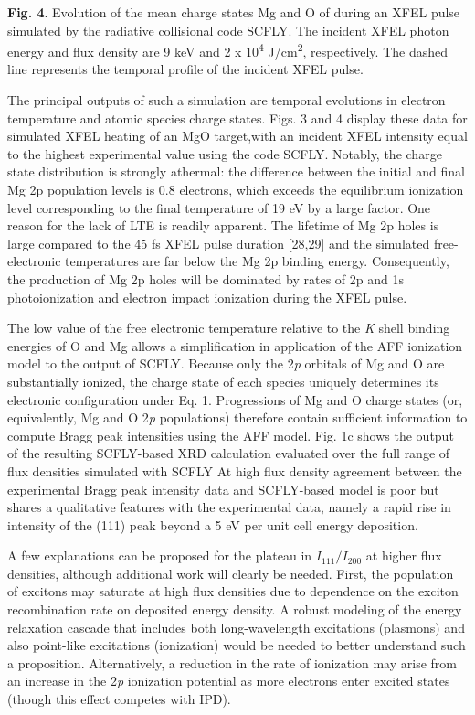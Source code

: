 \textbf{Fig. 4}. Evolution of the mean charge states Mg and O of during
an XFEL pulse simulated by the radiative collisional code SCFLY. The
incident XFEL photon energy and flux density are 9 keV and 2 x
10\textsuperscript{4} J/cm\textsuperscript{2}, respectively. The dashed
line represents the temporal profile of the incident XFEL pulse.

The principal outputs of such a simulation are temporal evolutions in
electron temperature and atomic species charge states. Figs. 3 and 4
display these data for simulated XFEL heating of an MgO target,with an
incident XFEL intensity equal to the highest experimental value using
the code SCFLY. Notably, the charge state distribution is strongly
athermal: the difference between the initial and final Mg 2p population
levels is 0.8 electrons, which exceeds the equilibrium ionization level
corresponding to the final temperature of 19 eV by a large factor. One
reason for the lack of LTE is readily apparent. The lifetime of Mg 2p
holes is large compared to the 45 fs XFEL pulse duration {[}28,29{]} and
the simulated free-electronic temperatures are far below the Mg 2p
binding energy. Consequently, the production of Mg 2p holes will be
dominated by rates of 2p and 1s photoionization and electron impact
ionization during the XFEL pulse.

\FloatBarrier

The low value of the free electronic temperature relative to the
\emph{K} shell binding energies of O and Mg allows a simplification in
application of the AFF ionization model to the output of SCFLY. Because
only the 2\emph{p} orbitals of Mg and O are substantially ionized, the
charge state of each species uniquely determines its electronic
configuration under Eq. 1. Progressions of Mg and O charge states (or,
equivalently, Mg and O 2\emph{p} populations) therefore contain
sufficient information to compute Bragg peak intensities using the AFF
model. Fig. 1c shows the output of the resulting SCFLY-based XRD
calculation evaluated over the full range of flux densities simulated
with SCFLY At high flux density agreement between the experimental Bragg
peak intensity data and SCFLY-based model is poor but shares a
qualitative features with the experimental data, namely a rapid rise in
intensity of the (111) peak beyond a 5 eV per unit cell energy
deposition.

A few explanations can be proposed for the plateau in
\(I_{111}/I_{200}\) at higher flux densities, although additional work
will clearly be needed. First, the population of excitons may saturate
at high flux densities due to dependence on the exciton recombination
rate on deposited energy density. A robust modeling of the energy
relaxation cascade that includes both long-wavelength excitations
(plasmons) and also point-like excitations (ionization) would be needed
to better understand such a proposition. Alternatively, a reduction in
the rate of ionization may arise from an increase in the 2\emph{p}
ionization potential as more electrons enter excited states (though this
effect competes with IPD).

